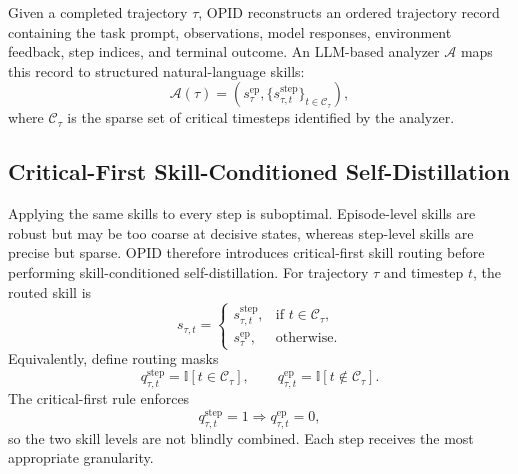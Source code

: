 \documentclass{llmxive}
\providecommand{\ind}{\mathbb{I}}
\begin{document}
Given a completed trajectory $\tau$, OPID{} reconstructs an ordered trajectory record containing the task prompt, observations, model responses, environment feedback, step indices, and terminal outcome. An LLM-based analyzer $\mathcal{A}$ maps this record to structured natural-language skills:
\begin{equation*}
    \mathcal{A}(\tau) =
    \left(
        s^{\mathrm{ep}}_{\tau},
        \{s^{\mathrm{step}}_{\tau,t}\}_{t\in\mathcal{C}_\tau}
    \right),
\end{equation*}
where $\mathcal{C}_\tau$ is the sparse set of critical timesteps identified by the analyzer.


\subsection{Critical-First Skill-Conditioned Self-Distillation}

Applying the same skills to every step is suboptimal. Episode-level skills are robust but may be too coarse at decisive states, whereas step-level skills are precise but sparse. OPID{} therefore introduces critical-first skill routing before performing skill-conditioned self-distillation. For trajectory $\tau$ and timestep $t$, the routed skill is
\begin{equation*}
    s_{\tau,t} =
    \begin{cases}
    s^{\mathrm{step}}_{\tau,t}, & \text{if } t\in\mathcal{C}_\tau, \\
    s^{\mathrm{ep}}_{\tau}, & \text{otherwise}.
    \end{cases}
\end{equation*}
Equivalently, define routing masks
\renewcommand{\ind}{\mathbb{I}}
\begin{equation*}
    q^{\mathrm{step}}_{\tau,t}=\ind[t\in\mathcal{C}_\tau],
    \qquad
    q^{\mathrm{ep}}_{\tau,t}=\ind[t\notin\mathcal{C}_\tau].
\end{equation*}
The critical-first rule enforces
\begin{equation*}
    q^{\mathrm{step}}_{\tau,t}=1 \Rightarrow q^{\mathrm{ep}}_{\tau,t}=0,
\end{equation*}
so the two skill levels are not blindly combined. Each step receives the most appropriate granularity.
\end{document}
